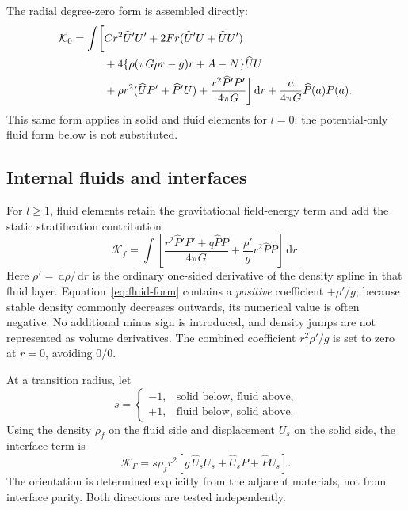 \documentclass[11pt,a4paper]{article}
\newcommand{\dd}{\,\mathrm{d}}
\begin{document}
The radial degree-zero form is assembled directly:
\begin{align}
\mathcal{K}_{0}=\int\biggl[
&Cr^2\widehat{U}'U'
+2Fr(\widehat{U}'U+\widehat{U}U') \notag\\
&+4\{\rho(\pi G\rho r-g)r+A-N\}\widehat{U}U \notag\\
&+\rho r^2(\widehat{U}P'+\widehat{P}'U)
+\frac{r^2\widehat{P}'P'}{4\pi G}
\biggr]\dd r
+\frac{a}{4\pi G}\widehat{P}(a)P(a).
\label{eq:radial-form}
\end{align}
This same form applies in solid and fluid elements for \(l=0\); the
potential-only fluid form below is not substituted.

\subsection{Internal fluids and interfaces}

For \(l\geq1\), fluid elements retain the gravitational field-energy term
and add the static stratification contribution
\begin{equation}
\mathcal{K}_{f}=\int\left[
 \frac{r^2\widehat{P}'P'+q\widehat{P}P}{4\pi G}
 +\frac{\rho'}{g}r^2\widehat{P}P
\right]\dd r . \label{eq:fluid-form}
\end{equation}
Here \(\rho'=\dd\rho/\dd r\) is the ordinary one-sided derivative of the
density spline in that fluid layer.  Equation~\eqref{eq:fluid-form} contains
a \emph{positive} coefficient \(+\rho'/g\); because stable density commonly
decreases outwards, its numerical value is often negative.  No additional
minus sign is introduced, and density jumps are not represented as volume
derivatives.  The combined coefficient \(r^2\rho'/g\) is set to zero at
\(r=0\), avoiding \(0/0\).

At a transition radius, let
\[
s=\begin{cases}
-1,&\text{solid below, fluid above},\\
+1,&\text{fluid below, solid above}.
\end{cases}
\]
Using the density \(\rho_f\) on the fluid side and displacement \(U_s\) on
the solid side, the interface term is
\begin{equation}
\mathcal{K}_{\Gamma}=
s\rho_f r^2\left[
g\,\widehat{U}_sU_s+\widehat{U}_sP+\widehat{P}U_s
\right]. \label{eq:interface}
\end{equation}
The orientation is determined explicitly from the adjacent materials, not
from interface parity.  Both directions are tested independently.
\end{document}
